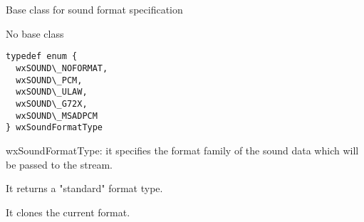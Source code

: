 %
%


\section{}\label{wxsoundformatbase}


Base class for sound format specification


No base class


{\small \begin{verbatim}
typedef enum {
  wxSOUND\_NOFORMAT,
  wxSOUND\_PCM,
  wxSOUND\_ULAW,
  wxSOUND\_G72X,
  wxSOUND\_MSADPCM
} wxSoundFormatType
\end{verbatim}}

wxSoundFormatType: it specifies the format family of the sound data
which will be passed to the stream.


\label{wxsoundformatbasewxsoundformatbase}



\label{wxsoundformatbasedtor}



\label{wxsoundformatbasegettype}


It returns a "standard" format type.


\label{wxsoundformatbaseclone}


It clones the current format.


\label{wxsoundformatbasegettimefrombytes}



\label{wxsoundformatbasegetbytesfromtime}



\label{wxsoundformatbaseoperatorneq}


